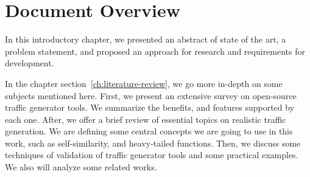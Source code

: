 



\section{Document Overview}


In this introductory chapter, we presented an abstract of state of the art, a problem statement, and proposed an approach for research and requirements for development.

In the chapter section~\ref{ch:literature-review}, we go more in-depth on some subjects mentioned here. First, we present an extensive survey on open-source traffic generator tools. We summarize the benefits, and features supported by each one. After, we offer a brief review of essential topics on realistic traffic generation. We are defining some central concepts we are going to use in this work, such as self-similarity, and heavy-tailed functions. Then, we discuss some techniques of validation of traffic generator tools and some practical examples. We also will analyze some related works. 

